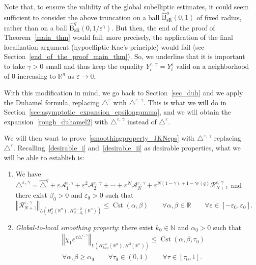 \documentclass[10pt]{amsart}
\theoremstyle{definition}\newtheorem{defi}[theo]{Definition}\newtheorem{rema}[theo]{Remark}\newtheorem{exam}[theo]{Example}\newtheorem{exem}[theo]{Example}\newtheorem{nota}[theo]{Notation}
\newcommand*\R{\mathbb{R}}
\newcommand*\N{\mathbb{N}}
\newcommand{\calA}{\mathcal{A}}
\newcommand{\calR}{\mathcal{R}}
\DeclareMathOperator{\Cst}{Cst}
\newcommand{\hatBsR}{\widehat{\mathrm{B}}_{\mathrm{sR}}}
\renewcommand{\geq}{\geqslant}
\renewcommand{\leq}{\leqslant}
\newcommand*{\Penumi}{\renewcommand*{\theenumi}{$\mathbf{P}_\arabic{enumi}$}}
\let\oldforall\forall
\renewcommand*{\forall}{\mathrel{\oldforall}}
\begin{document}
Note that, to ensure the validity of the global subelliptic estimates, it could seem sufficient to consider the above truncation on a ball $\hatBsR^{q}(0,1)$ of fixed radius, rather than on a ball $\hatBsR^{q}(0,1/\varepsilon^\gamma)$. But then, the end of the proof of Theorem~\ref{main_thm} would fail; more precisely, the application of the final localization argument (hypoelliptic Kac's principle) would fail (see Section~\ref{end_of_the_proof_main_thm}). So, we underline that it is important to take $\gamma>0$ small and thus keep the equality $Y_i^{\varepsilon,\,\gamma} = Y_i^\varepsilon$ valid on a neighborhood of $0$ increasing to $\R^n$ as $\varepsilon\rightarrow 0$.


With this modification in mind, we go back to Section~\ref{sec_duh} and we apply the Duhamel formula, replacing $\triangle^\varepsilon$ with $\triangle^{\varepsilon,\,\gamma}$. This is what we will do in Section~\ref{sec:asymptotic_expansion_epsilongamma}, and we will obtain the expansion~\eqref{rough_duhamel2} with $\triangle^{\varepsilon,\,\gamma}$ instead of $\triangle^\varepsilon$.

We will then want to prove~\eqref{smoothingproperty_JKNeps} with $\triangle^{\varepsilon,\,\gamma}$ replacing $\triangle^\varepsilon$. Recalling~\eqref{desirable_i} and~\eqref{desirable_ii} as desirable properties, what we will be able to establish is:
\begin{enumerate}\Penumi
\setcounter{enumi}{4}
\item\label{Repsgam}
We have $\triangle^{\varepsilon,\,\gamma} = \widehat{\triangle}^{q} + \varepsilon \calA_1^{\varepsilon,\gamma} + \varepsilon^2 \calA_2^{\varepsilon,\,\gamma} + \cdots + \varepsilon^N \calA_N^{\varepsilon,\,\gamma} + \varepsilon^{N(1-\gamma)+1-\gamma r(q)} \calR_{N+1}^{\varepsilon,\,\gamma}$ and there exist $\beta_0>0$ and $\varepsilon_0>0$ such that
\[
\left\Vert \calR_{N+1}^{\varepsilon,\,\gamma}\right\Vert_{L\left(H^\alpha_\beta(\R^n),H^{\alpha-2}_{\beta-\beta_0}(\R^n)\right)} \leq \Cst(\alpha,\beta) \qquad \forall\alpha,\beta\in\R \qquad \forall\varepsilon\in[-\varepsilon_0,\varepsilon_0].
\]

\item\label{globsmootheps}
\emph{Global-to-local smoothing property}: there exist $k_0\in\N$ and $\alpha_0>0$ such that
\begin{multline*}
\left\Vert \chi_1 e^{\tau \triangle^{\varepsilon,\,\gamma}}\right\Vert_{L\left(H^{-\alpha}_{k_0\,\alpha}(\R^n),H^{\beta}(\R^n)\right)} \leq \Cst(\alpha,\beta,\tau_0) \\
\forall \alpha,\beta\geq\alpha_0 \qquad \forall \tau_0\in(0,1) \qquad \forall\tau\in[\tau_0,1].
\end{multline*}
\end{enumerate}
\end{document}
